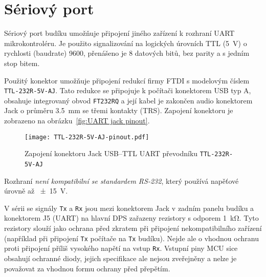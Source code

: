 \section{Sériový port}
Sériový port budíku umožňuje připojení jiného zařízení k rozhraní \acs{UART}
mikrokontroléru. Je použito signalizování na logických úrovních \acs{TTL}
(\SI{5}{\volt}) o rychlosti (\foreignlanguage{english}{baudrate})
\SI{9600}{\baud}, přenášeno je \num{8} datových bitů, bez parity a s jedním
stop bitem.

Použitý konektor umožňuje připojení redukcí firmy FTDI s modelovým číslem
\texttt{TTL-232R-5V-AJ}. Tato redukce se připojuje k počítači konektorem USB
typ A, obsahuje integrovaný obvod \texttt{FT232RQ} a její kabel je zakončen
audio konektorem Jack o průměru \SI{3,5}{\milli\meter} se třemi kontakty (TRS).
Zapojení konektoru je zobrazeno na obrázku~\vref{fig:UART jack pinout}.

\begin{figure}[htbp]
    \centering
    \texttt{[image: TTL-232R-5V-AJ-pinout.pdf]}
    \caption{%
        Zapojení konektoru Jack USB--TTL UART převodníku
        \texttt{TTL-232R-5V-AJ}~\cite{TTL-232R}
    }
    \label{fig:UART jack pinout}
\end{figure}

Rozhraní \emph{není kompatibilní se standardem RS-232}, který používá napěťové
úrovně až \SI{\pm15}{\volt}.

V sérii se signály \texttt{Tx} a \texttt{Rx} jsou mezi konektorem Jack v zadním
panelu budíku a konektorem J5 (UART) na hlavní DPS zařazeny rezistory s odporem
\SI{1}{\kilo\ohm}. Tyto rezistory slouží jako ochrana před zkratem při
připojení nekompatibilního zařízení (například při připojení \texttt{Tx}
počítače na \texttt{Tx} budíku). Nejde ale o vhodnou ochranu proti připojení
příliš vysokého napětí na vstup \texttt{Rx}. Vstupní piny \acs{MCU} sice
obsahují ochranné diody, jejich specifikace ale nejsou zveřejněny a nelze je
považovat za vhodnou formu ochrany před přepětím.~\cite{dshATmega328}
